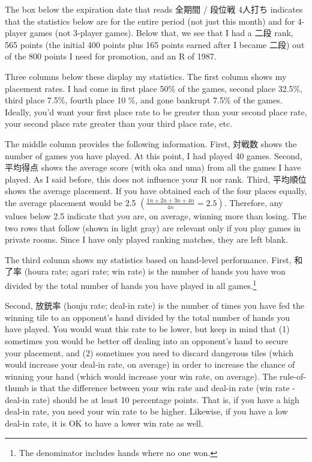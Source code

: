\bigskip

The box below the expiration date that reads 全期間 / 段位戦 4人打ち indicates that the statistics below are for the entire period (not just this month) and for 4-player games (not 3-player games). Below that, we see that I had a 二段 rank, 565 points (the initial 400 points plus 165 points earned after I became 二段) out of the 800 points I need for promotion, and an R of 1987.

\bigskip

Three columns below these display my statistics. The first column shows my placement rates. I had come in first place 50\% of the games, second place 32.5\%, third place 7.5\%, fourth place 10 \%, and gone bankrupt 7.5\% of the games. Ideally, you'd want your first place rate to be greater than your second place rate, your second place rate greater than your third place rate, etc.

\bigskip

The middle column provides the following information. First, 対戦数 shows the number of games you have played. At this point, I had played 40 games. Second, 平均得点 shows the average score (with {\jap oka} and {\jap uma}) from all the games I have played. As I said before, this does not influence your R nor rank. Third, 平均順位 shows the average placement. If you have obtained each of the four places equally, the average placement would be 2.5 $\left( \frac{1  n + 2  n + 3  n + 4 n}{4n} = 2.5 \right)$. Therefore, any values below 2.5 indicate that you are, on average, winning more than losing.
The two rows that follow (shown in light gray) are relevant only if you play games in private rooms. Since I have only played ranking matches, they are left blank.

\bigskip

The third column shows my statistics based on hand-level performance. First, 和了率 ({\jap houra} rate; {\jap agari} rate; win rate) is the number of hands you have won divided by the total number of hands you have played in all games.\footnote{The denominator includes hands where no one won.}

\bigskip
Second, 放銃率 ({\jap houju} rate; deal-in rate) is the number of times you have fed the winning tile to an opponent's hand divided by the total number of hands you have played. You would want this rate to be lower, but keep in mind that (1) sometimes you would be better off dealing into an opponent's hand to secure your placement, and (2) sometimes you need to discard dangerous tiles (which would increase your deal-in rate, on average) in order to increase the chance of winning your hand (which would increase your win rate, on average). The rule-of-thumb is that the difference between your win rate and deal-in rate (win rate - deal-in rate) should be at least 10 percentage points. That is, if you have a high deal-in rate, you need your win rate to be higher. Likewise, if you have a low deal-in rate, it is OK to have a lower win rate as well.

